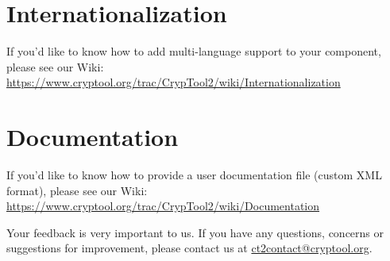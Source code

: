 \chapter{Internationalization}
\label{sec:Internationalization}

If you'd like to know how to add multi-language support to your component, please see our Wiki:
\url {https://www.cryptool.org/trac/CrypTool2/wiki/Internationalization}

\chapter{Documentation}
\label{sec:Documentation}

If you'd like to know how to provide a user documentation file (custom XML format), please see our Wiki:
\url{https://www.cryptool.org/trac/CrypTool2/wiki/Documentation}

\vskip 2cm

Your feedback is very important to us. If you have any questions, concerns or suggestions for improvement, please contact us at \href{mailto:ct2contact@cryptool.org}{ct2contact@cryptool.org}.
